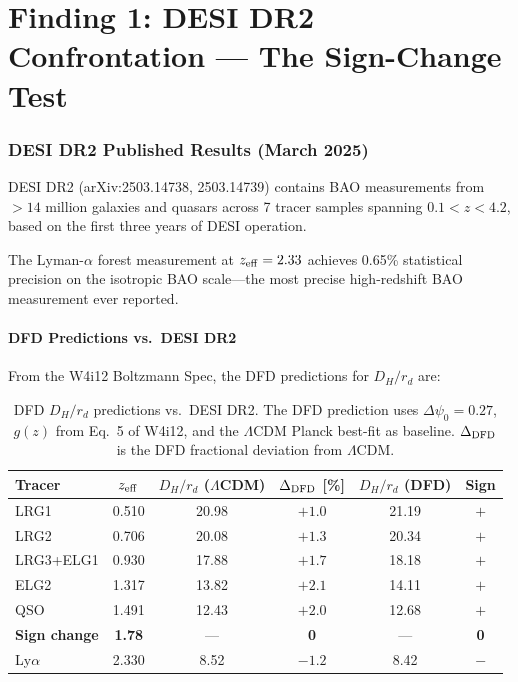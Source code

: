 \documentclass[11pt,a4paper]{article}
\newcommand{\LCDM}{$\Lambda$CDM}
\begin{document}
\part{Finding 1: DESI DR2 Confrontation --- The Sign-Change Test}
\label{sec:desi-confrontation}

\section{DESI DR2 Published Results (March 2025)}

DESI DR2 (arXiv:2503.14738, 2503.14739) contains BAO measurements from
$>14$ million galaxies and quasars across 7 tracer samples spanning
$0.1 < z < 4.2$, based on the first three years of DESI operation.

The Lyman-$\alpha$ forest measurement at $z_{\rm eff} = 2.33$ achieves
0.65\% statistical precision on the isotropic BAO scale---the most
precise high-redshift BAO measurement ever reported.

\subsection{DFD Predictions vs.\ DESI DR2}

From the W4i12 Boltzmann Spec, the DFD predictions for $D_H/r_d$ are:

\begin{table}[H]
\centering
\caption{DFD $D_H/r_d$ predictions vs.\ DESI DR2. The DFD prediction uses
$\Delta\psi_0 = 0.27$, $g(z)$ from Eq.~5 of W4i12, and the \LCDM{} Planck
best-fit as baseline. $\Delta_{\rm DFD}$ is the DFD fractional deviation
from \LCDM.}
\label{tab:desi-dr2}
\begin{tabular}{lccccc}
\toprule
\textbf{Tracer} & $z_{\rm eff}$ & $D_H/r_d$ (\LCDM) &
  $\Delta_{\rm DFD}$ [\%] & $D_H/r_d$ (DFD) & \textbf{Sign} \\
\midrule
LRG1 & 0.510 & 20.98 & $+1.0$ & 21.19 & $+$ \\
LRG2 & 0.706 & 20.08 & $+1.3$ & 20.34 & $+$ \\
LRG3+ELG1 & 0.930 & 17.88 & $+1.7$ & 18.18 & $+$ \\
ELG2 & 1.317 & 13.82 & $+2.1$ & 14.11 & $+$ \\
QSO & 1.491 & 12.43 & $+2.0$ & 12.68 & $+$ \\
\midrule
\textbf{Sign change} & \textbf{1.78} & --- & \textbf{0} & --- & \textbf{0} \\
\midrule
Ly$\alpha$ & 2.330 & 8.52 & $-1.2$ & 8.42 & $-$ \\
\bottomrule
\end{tabular}
\end{table}
\end{document}
